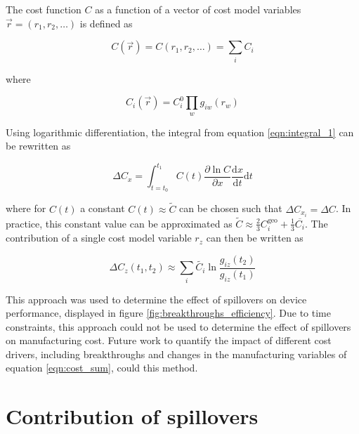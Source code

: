\documentclass[10pt]{article}
\begin{document}
The cost function $C$ as a function of a vector of cost model variables $\vec{r}=(r_1,r_2,\dots)$ is defined as

\begin{equation}
C(\vec{r}) = C(r_1,r_2, \dots) = \sum_i C_i
\end{equation}

where

\begin{equation}
C_i(\vec{r}) = C_i^0 \prod_w g_{iw}(r_w)
\end{equation}

Using logarithmic differentiation, the integral from equation \ref{eqn:integral_1} can be rewritten as

\begin{equation}
\Delta C_x = \int_{t=t_0}^{t_1} C(t) \frac{ \partial \ln C }{ \partial x } \frac{ \text{d} x }{ \text{d} t} \text{d} t
\end{equation}

where for $C(t)$ a constant $C(t) \approx \tilde{C} $ can be chosen such that $\Delta C_{x_i} = \Delta C$. In practice, this constant value can be approximated as $\tilde{C} \approx \frac{2}{3} C_i^\text{geo} + \frac{1}{3} \overline{C_i}$. The contribution of a single cost model variable $r_z$ can then be written as

\begin{equation}
\Delta C_z (t_1,t_2) \approx \sum_i \tilde{C_i} \ln \frac{g_{iz}(t_2)}{g_{iz}(t_1)}
\end{equation}

This approach was used to determine the effect of spillovers on device performance, displayed in figure \ref{fig:breakthroughs_efficiency}. Due to time constraints, this approach could not be used to determine the effect of spillovers on manufacturing cost. Future work to quantify the impact of different cost drivers, including breakthroughs and changes in the manufacturing variables of equation \ref{eqn:cost_sum}, could this method.

\section{Contribution of spillovers}
\end{document}
